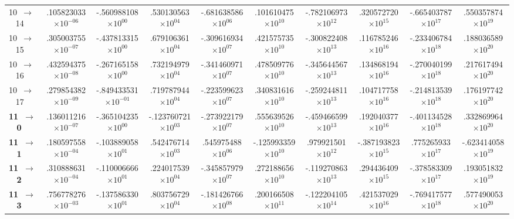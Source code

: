 \documentclass[reviewcopy]{elsarticle}
\begin{document}
\begin{landscape}
\begin{longtable}{lccccccccc}
 10~$\to$~ 14  &   .105823033$\times10^{-06}$ & -.560988108$\times10^{ 00}$ &  .530130563$\times10^{ 04}$ & -.681638586$\times10^{ 06}$ &  .101610475$\times10^{ 10}$ & -.782106973$\times10^{ 12}$ &  .320572720$\times10^{ 15}$ & -.665403787$\times10^{ 17}$ &  .550357874$\times10^{ 19}$ \\
 10~$\to$~ 15  &  .305003755$\times10^{-07}$ & -.437813315$\times10^{ 00}$ &  .679106361$\times10^{ 04}$ & -.309616934$\times10^{ 07}$ &  .421575735$\times10^{ 10}$ & -.300822408$\times10^{ 13}$ &  .116785246$\times10^{ 16}$ & -.233406784$\times10^{ 18}$ &  .188036589$\times10^{ 20}$ \\
 10~$\to$~ 16  &   .432594375$\times10^{-08}$ & -.267165158$\times10^{ 00}$ &  .732194979$\times10^{ 04}$ & -.341460971$\times10^{ 07}$ &  .478509776$\times10^{ 10}$ & -.345644567$\times10^{ 13}$ &  .134868194$\times10^{ 16}$ & -.270040199$\times10^{ 18}$ & .217617494$\times10^{ 20}$ \\
 10~$\to$~ 17  &   .279854382$\times10^{-09}$ & -.849433531$\times10^{-01}$ &  .719787944$\times10^{ 04}$ & -.223599623$\times10^{ 07}$ &  .340831616$\times10^{ 10}$ & -.259244811$\times10^{ 13}$ &  .104717758$\times10^{ 16}$ & -.214813539$\times10^{ 18}$ &  .176197742$\times10^{ 20}$ \\[7pt]
{\bf 11~$\to$~ 0}   &   .136011216$\times10^{-07}$ & -.365104235$\times10^{ 00}$ & -.123760721$\times10^{ 03}$ & -.273922179$\times10^{ 07}$ &  .555639526$\times10^{ 10}$ & -.459466599$\times10^{ 13}$ &  .192040377$\times10^{ 16}$ & -.401134528$\times10^{ 18}$ &  .332869964$\times10^{ 20}$ \\
{\bf 11~$\to$~ 1}   &   .180597558$\times10^{-04}$ & -.103889058$\times10^{ 01}$ &  .542476714$\times10^{ 03}$ &  .545975488$\times10^{ 06}$ & -.125993359$\times10^{ 10}$ &  .979921501$\times10^{ 12}$ & -.387193823$\times10^{ 15}$ &  .775265933$\times10^{ 17}$ & -.623414058$\times10^{ 19}$ \\
{\bf 11~$\to$~ 2}   &   .310888631$\times10^{-04}$ & -.110006666$\times10^{ 01}$ & .224017539$\times10^{ 04}$ & -.345857979$\times10^{ 07}$ &  .272188656$\times10^{ 10}$ & -.119270863$\times10^{ 13}$ &  .294436409$\times10^{ 15}$ & -.378583309$\times10^{ 17}$ &  .193051832$\times10^{ 19}$ \\
{\bf 11~$\to$~ 3}   &   .756778276$\times10^{-03}$ & -.137586330$\times10^{ 01}$ &  .803756729$\times10^{ 04}$ & -.181426766$\times10^{ 08}$ &  .200166508$\times10^{ 11}$ & -.122204105$\times10^{ 14}$ &  .421537029$\times10^{ 16}$ & -.769417577$\times10^{ 18}$ &  .577490053$\times10^{ 20}$ \\

\end{longtable}
\end{landscape}
\end{document}
